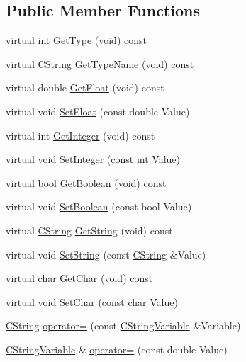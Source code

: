 \subsection*{Public Member Functions}
\begin{DoxyCompactItemize}
\item 
virtual int \hyperlink{classCStringVariable_ad4221d67931a3e5989b68f86f9ac17a5}{Get\-Type} (void) const 
\item 
virtual \hyperlink{classCString}{C\-String} \hyperlink{classCStringVariable_a273201d7d7bad13505b6fb1de8a6f8b1}{Get\-Type\-Name} (void) const 
\item 
virtual double \hyperlink{classCStringVariable_a4c688ce2df39f1a95f4192022fa19fe3}{Get\-Float} (void) const 
\item 
virtual void \hyperlink{classCStringVariable_a1641601e03140c2506e12fb5cf4ba183}{Set\-Float} (const double Value)
\item 
virtual int \hyperlink{classCStringVariable_af74a2229963f55b56e1074672740c5c4}{Get\-Integer} (void) const 
\item 
virtual void \hyperlink{classCStringVariable_a5198df479e50de3b5d6ead3b0e1267cc}{Set\-Integer} (const int Value)
\item 
virtual bool \hyperlink{classCStringVariable_a0538264d00be273bf14c365443d386ce}{Get\-Boolean} (void) const 
\item 
virtual void \hyperlink{classCStringVariable_a17c2e46cc9e691a3c046f40227cbc337}{Set\-Boolean} (const bool Value)
\item 
virtual \hyperlink{classCString}{C\-String} \hyperlink{classCStringVariable_a1ecfc3189581b399444ecb9ab8b9986e}{Get\-String} (void) const 
\item 
virtual void \hyperlink{classCStringVariable_a905a362dccbeb5c062129219bdba5e0f}{Set\-String} (const \hyperlink{classCString}{C\-String} \&Value)
\item 
virtual char \hyperlink{classCStringVariable_aa9dd206d688105c4c9826150b9f67e94}{Get\-Char} (void) const 
\item 
virtual void \hyperlink{classCStringVariable_a118232dd1452cdd6052b12ecd423b59c}{Set\-Char} (const char Value)
\item 
\hyperlink{classCString}{C\-String} \hyperlink{classCStringVariable_aec6d765b911163fb5859cd488a991e45}{operator=} (const \hyperlink{classCStringVariable}{C\-String\-Variable} \&Variable)
\item 
\hyperlink{classCStringVariable}{C\-String\-Variable} \& \hyperlink{classCStringVariable_aa806d77841c5c1c2311835c4826d1cbb}{operator=} (const double Value)

\end{DoxyCompactItemize}
